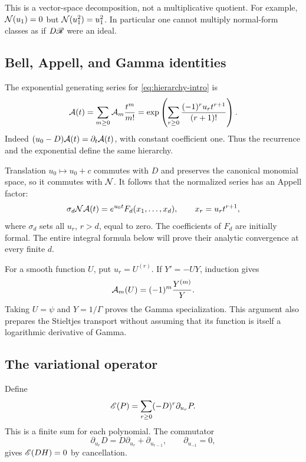 This is a vector-space decomposition, not a multiplicative quotient. For example, $\mathcal N(u_1)=0$ but $\mathcal N(u_1^2)=u_1^2$. In particular one cannot multiply normal-form classes as if $D\mathscr R$ were an ideal.

\subsection{Bell, Appell, and Gamma identities}

The exponential generating series for \eqref{eq:hierarchy-intro} is
\begin{equation}\label{eq:Bell}
 \mathcal A(t)=\sum_{m\ge0}\mathcal A_m\frac{t^m}{m!}
 =\exp\left(\sum_{r\ge0}\frac{(-1)^r u_rt^{r+1}}{(r+1)!}\right).
\end{equation}
Indeed $(u_0-D)\mathcal A(t)=\partial_t\mathcal A(t)$, with constant coefficient one. Thus the recurrence and the exponential define the same hierarchy.

Translation $u_0\mapsto u_0+c$ commutes with $D$ and preserves the canonical monomial space, so it commutes with $\mathcal N$. It follows that the normalized series has an Appell factor:
\begin{equation}\label{eq:appell}
 \sigma_d\mathcal N\mathcal A(t)=e^{u_0t}F_d(x_1,\ldots,x_d),
 \qquad x_r=u_rt^{r+1},
\end{equation}
where $\sigma_d$ sets all $u_r$, $r>d$, equal to zero. The coefficients of $F_d$ are initially formal. The entire integral formula below will prove their analytic convergence at every finite $d$.

For a smooth function $U$, put $u_r=U^{(r)}$. If $Y'=-UY$, induction gives
\begin{equation}\label{eq:YBell}
 \mathcal A_m(U)=(-1)^m\frac{Y^{(m)}}{Y}.
\end{equation}
Taking $U=\psi$ and $Y=1/\Gamma$ proves the Gamma specialization. This argument also prepares the Stieltjes transport without assuming that its function is itself a logarithmic derivative of Gamma.

\subsection{The variational operator}

Define
\begin{equation}\label{eq:Euler}
 \mathscr E(P)=\sum_{r\ge0}(-D)^r\partial_{u_r}P.
\end{equation}
This is a finite sum for each polynomial. The commutator
\[
 \partial_{u_r}D=D\partial_{u_r}+\partial_{u_{r-1}},
 \qquad \partial_{u_{-1}}=0,
\]
gives $\mathscr E(DH)=0$ by cancellation.

